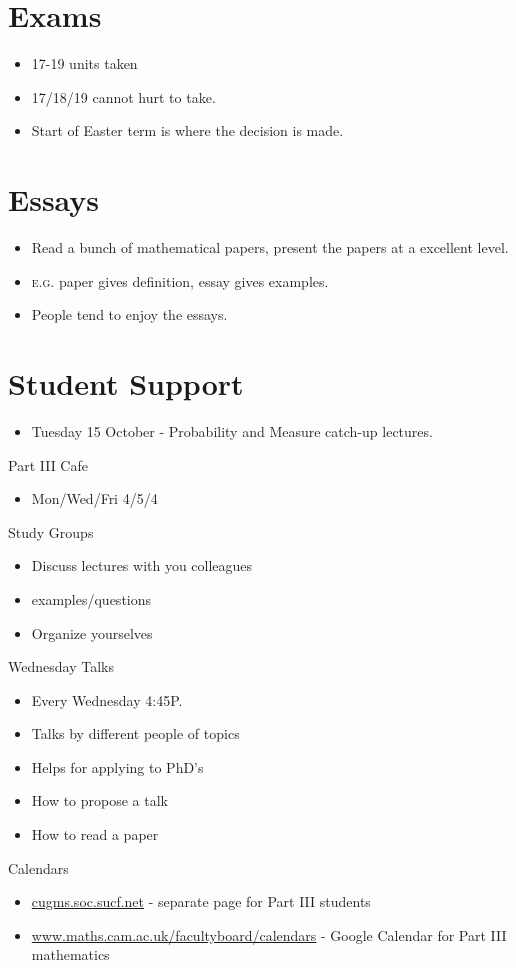 \section{Exams}
\label{sec:exams}

\begin{itemize}
\item 17-19 units taken
\item 17/18/19 cannot hurt to take.
\item Start of Easter term is where the decision is made.
\end{itemize}

\section{Essays}
\label{sec:essays}

\begin{itemize}
\item Read a bunch of mathematical papers, present the papers at a
  excellent level.
\item \textsc{e.g.} paper gives definition, essay gives examples.
\item People tend to enjoy the essays.
\end{itemize}

\section{Student Support}
\label{sec:student-support}

\begin{itemize}
\item Tuesday 15 October - Probability and Measure catch-up lectures.
\end{itemize}

Part III Cafe
\begin{itemize}
\item Mon/Wed/Fri 4/5/4
\end{itemize}

Study Groups

\begin{itemize}
\item Discuss lectures with you colleagues
\item examples/questions
\item Organize yourselves
\end{itemize}

Wednesday Talks

\begin{itemize}
\item Every Wednesday 4:45P.
\item Talks by different people of topics
\item Helps for applying to PhD's
\item How to propose a talk
\item How to read a paper
\end{itemize}

Calendars

\begin{itemize}
\item \url{cugms.soc.sucf.net} - separate page for Part III students
\item \url{www.maths.cam.ac.uk/facultyboard/calendars} - Google
  Calendar for Part III mathematics
\end{itemize}


